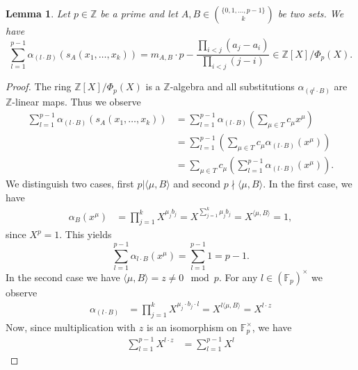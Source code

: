 \documentclass[a4paper]{article}
\newcommand{\Z}{\ensuremath{\mathbb{Z}}}
\newcommand{\F}{\mathbb{F}}
\newtheorem{lemma}[theorem]{Lemma}
\numberwithin{equation}{section}
\numberwithin{table}{section}
\numberwithin{figure}{section}
\begin{document}
\begin{lemma}\label{EvaluationSumOfSchur}
    Let $p\in \Z$ be a prime and let $A,B \in \binom{\{0,1,\ldots,p-1\}}{k}$ be two sets.
    We have
    \[
    \sum_{l=1}^{p-1}\alpha_{(l \cdot B)}(s_A(x_1,\ldots,x_k)) = m_{A,B} \cdot p - \frac{\prod_{i<j}(a_j-a_i)}{\prod_{i<j}(j-i)} \in \Z[X]/\Phi_p(X).
    \]
\end{lemma}

\begin{proof}
    The ring $\Z[X]/\Phi_p(X)$ is a $\Z$-algebra and all substitutions $\alpha_{(q^l\cdot B)}$ are $\Z$-linear maps. Thus we observe
    \begin{align*}
        \sum_{l=1}^{p-1}\alpha_{(l \cdot B)}(s_A(x_1,\ldots,x_k))&=
        \sum_{l=1}^{p-1}\alpha_{(l \cdot B)}\left(\sum_{\mu \in T}c_\mu x^\mu\right) \\
        &= \sum_{l=1}^{p-1}\left( \sum_{\mu \in T} c_\mu\alpha_{(l \cdot B)} (x^\mu)  \right)\\
        &= \sum_{\mu \in T}c_\mu\left( \sum_{l=1}^{p-1} \alpha_{(l \cdot B)} (x^\mu)  \right).
    \end{align*}
We distinguish two cases, first $p | \langle \mu , B \rangle$ and second $p \nmid \langle \mu, B \rangle$. In the first case, we have
\begin{align*}
    \alpha_{B}(x^\mu) &= \prod_{j=1}^k X^{\mu_j b_j} %
    = X^{\sum_{j=1}^k \mu_j b_j} %
    = X^{\langle \mu , B \rangle} %
    = 1,
\end{align*}
since $X^p=1$. This yields 
\[\sum_{l=1}^{p-1}\alpha_{l\cdot B}(x^\mu)=\sum_{l=1}^{p-1}1=p-1.\]
In the second case we have $\langle \mu, B \rangle = z\neq   0 \mod p$. For any $l \in (\F_p)^\times$ we observe
\begin{align*}
    \alpha_{(l \cdot B)}&=\prod_{j=1}^kX^{\mu_j \cdot b_j\cdot l} %
    = X^{l \langle \mu , B \rangle} %
    = X^{l \cdot z}
\end{align*}
Now, since multiplication with $z$ is an isomorphism on $\F_p^\times$, we have
\begin{align*}
    \sum_{l=1}^{p-1}X^{l \cdot z} &= \sum_{l=1}^{p-1}X^l 

\end{align*}
\end{proof}
\end{document}
